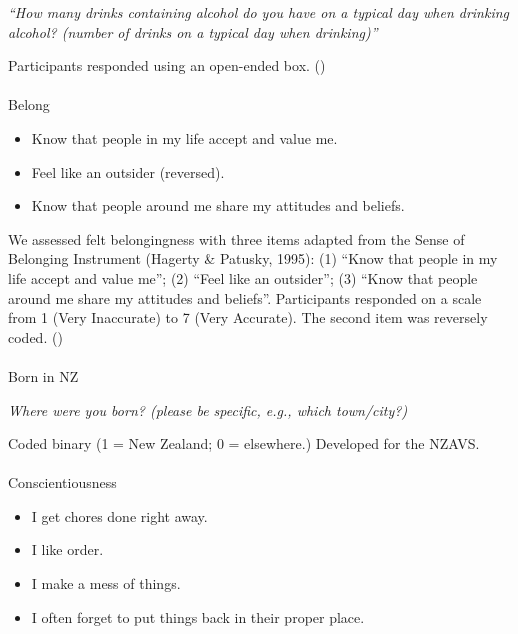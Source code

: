 \documentclass[
  single column]{article}
\makeatletter
\let\oldparagraph\paragraph
\renewcommand{\paragraph}{
    \@ifstar
      \xxxParagraphStar
      \xxxParagraphNoStar
  }
\newcommand{\xxxParagraphStar}[1]{\oldparagraph*{#1}\mbox{}}
\newcommand{\xxxParagraphNoStar}[1]{\oldparagraph{#1}\mbox{}}
\providecommand{\tightlist}{%
  \setlength{\itemsep}{0pt}\setlength{\parskip}{0pt}}\usepackage{longtable,booktabs,array}
\makeatother
\begin{document}
\emph{``How many drinks containing alcohol do you have on a typical day
when drinking alcohol? (number of drinks on a typical day when
drinking)''}

Participants responded using an open-ended box.
()

\paragraph{Belong}\label{belong}

\begin{itemize}
\tightlist
\item
  Know that people in my life accept and value me.
\item
  Feel like an outsider (reversed).
\item
  Know that people around me share my attitudes and beliefs.
\end{itemize}

We assessed felt belongingness with three items adapted from the Sense
of Belonging Instrument (Hagerty \& Patusky, 1995): (1) ``Know that
people in my life accept and value me''; (2) ``Feel like an outsider'';
(3) ``Know that people around me share my attitudes and beliefs''.
Participants responded on a scale from 1 (Very Inaccurate) to 7 (Very
Accurate). The second item was reversely coded.
()

\paragraph{Born in NZ}\label{born-in-nz}

\emph{Where were you born? (please be specific, e.g., which town/city?)}

Coded binary (1 = New Zealand; 0 = elsewhere.) Developed for the NZAVS.

\paragraph{Conscientiousness}\label{conscientiousness}

\begin{itemize}
\tightlist
\item
  I get chores done right away.
\item
  I like order.
\item
  I make a mess of things.
\item
  I often forget to put things back in their proper place.
\end{itemize}
\end{document}
